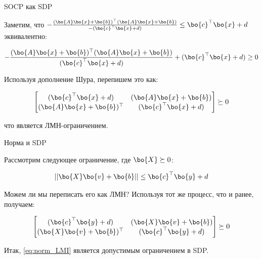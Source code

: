 \documentclass{beamer}
\begin{document}
\begin{frame}{SOCP как SDP}
	\begin{flushleft}
		
		Заметим, что $-\frac{(\bo{A}\bo{x} + \bo{b})^\top (\bo{A}\bo{x} + \bo{b})}{-(\bo{c}^\top \bo{x} + d)} \leq \bo{c}^\top \bo{x} + d$ эквивалентно:
		
		\begin{equation}
			-\frac{(\bo{A}\bo{x} + \bo{b})^\top (\bo{A}\bo{x} + \bo{b})}{(\bo{c}^\top \bo{x} + d)} + (\bo{c}^\top \bo{x} + d) \geq 0
		\end{equation}
		
		Используя дополнение Шура, перепишем это как:
		
		\begin{equation}
			\begin{bmatrix}
				(\bo{c}^\top \bo{x} + d) & (\bo{A}\bo{x} + \bo{b}) \\
				(\bo{A}\bo{x} + \bo{b})^\top & (\bo{c}^\top \bo{x} + d)
			\end{bmatrix} \succeq 0
		\end{equation}
		
		что является ЛМН-ограничением.
		
	\end{flushleft}
\end{frame}

\begin{frame}{Норма и SDP}
	\begin{flushleft}
		
		Рассмотрим следующее ограничение, где $\bo{X} \succeq 0$:
		
		\begin{equation}
			\label{eq:norm_LMI}
			||\bo{X}\bo{v} + \bo{b}|| \leq \bo{c}^\top \bo{y} + d
		\end{equation}
		
		Можем ли мы переписать его как ЛМН? Используя тот же процесс, что и ранее, получаем:
		
		\begin{align}
			\begin{bmatrix}
				(\bo{c}^\top \bo{y} + d) & (\bo{X}\bo{v} + \bo{b}) \\
				(\bo{X}\bo{v} + \bo{b})^\top & (\bo{c}^\top \bo{y} + d)
			\end{bmatrix} \succeq 0
		\end{align}
		
		Итак, \eqref{eq:norm_LMI} является допустимым ограничением в SDP.
		
	\end{flushleft}
\end{frame}
\end{document}
